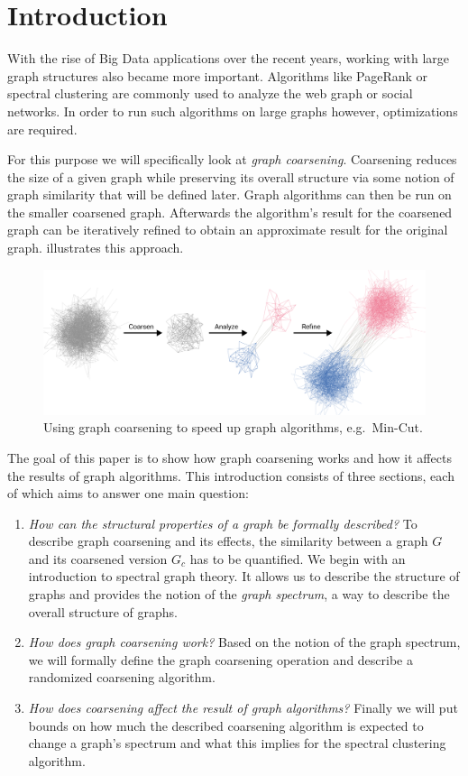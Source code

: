\section{Introduction}%
\label{sec:intro}

\setcounter{page}{1}			%

With the rise of Big Data applications over the recent years, working with large graph structures also became more important.
Algorithms like PageRank or spectral clustering are commonly used to analyze the web graph or social networks.
In order to run such algorithms on large graphs however, optimizations are required.

For this purpose we will specifically look at \textit{graph coarsening}.
Coarsening reduces the size of a given graph while preserving its overall structure via some notion of graph similarity that will be defined later.
Graph algorithms can then be run on the smaller coarsened graph.
Afterwards the algorithm's result for the coarsened graph can be iteratively refined to obtain an approximate result for the original graph.
 illustrates this approach.
\begin{figure}[ht]
	\centering
	\includegraphics[width=0.8\linewidth]{gfx/intro/overview.pdf}
	\caption{%
		Using graph coarsening to speed up graph algorithms, e.g.\  Min-Cut.
	}\label{fig:intro:overview}
\end{figure}

The goal of this paper is to show how graph coarsening works and how it affects the results of graph algorithms.
This introduction consists of three sections, each of which aims to answer one main question:
\begin{enumerate}
	\item \textit{How can the structural properties of a graph be formally described?}
		To describe graph coarsening and its effects, the similarity between a graph $G$ and its coarsened version $G_c$ has to be quantified.
		We begin with an introduction to spectral graph theory.
		It allows us to describe the structure of graphs and provides the notion of the \textit{graph spectrum}, a way to describe the overall structure of graphs.
	\item \textit{How does graph coarsening work?}
		Based on the notion of the graph spectrum, we will formally define the graph coarsening operation and describe a randomized coarsening algorithm.
	\item \textit{How does coarsening affect the result of graph algorithms?}
		Finally we will put bounds on how much the described coarsening algorithm is expected to change a graph's spectrum and what this implies for the spectral clustering algorithm.
\end{enumerate}
